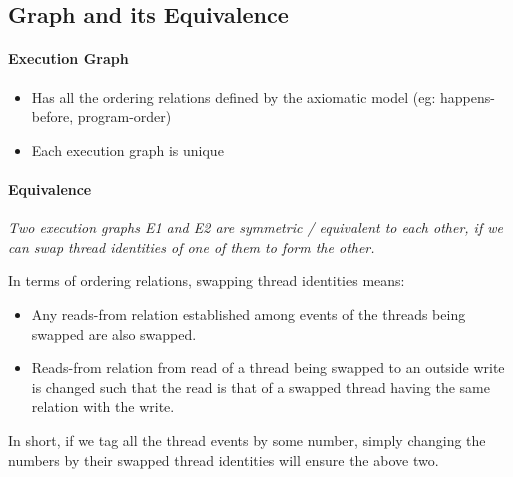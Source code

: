\subsection{Graph and its Equivalence}

    \paragraph{Execution Graph}
    
        \begin{itemize}
            \item Has all the ordering relations defined by the axiomatic model (eg: happens-before, program-order)
            \item Each execution graph is unique
        \end{itemize}
    
    
    \paragraph{Equivalence}
        \begin{center}
            \emph{\textit{
                Two execution graphs E1 and E2 are symmetric / equivalent to each other, if we can swap thread identities of one of them to form the other. 
            }}  
        \end{center}

        In terms of ordering relations, swapping thread identities means: 
        \begin{itemize}
            \item Any reads-from relation established among events of the threads being swapped are also swapped.
            \item Reads-from relation from read of a thread being swapped to an outside write is changed such that the read is that of a swapped thread having the same relation with the write.   
        \end{itemize}


        In short, if we tag all the thread events by some number, simply changing the numbers by their swapped thread identities will ensure the above two. 


